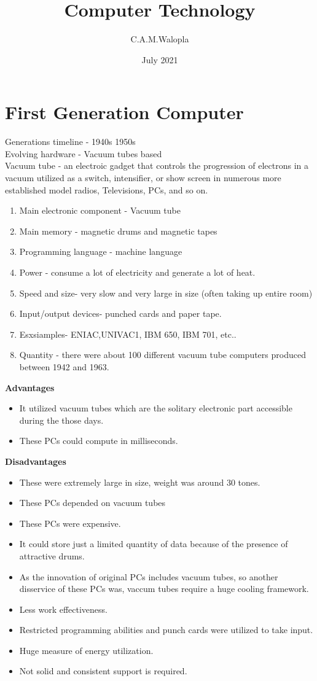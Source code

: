 \documentclass[a4paper,12pt]{article}
\begin{document}
\title{Computer Technology}
\author{C.A.M.Walopla}
\date{July 2021}
\section{First Generation Computer} 
Generations timeline - 1940s 1950s \\ 
Evolving hardware - Vacuum tubes based \\ 
Vacuum tube - an electroic gadget that controls the progression of electrons in a vacuum utilized as a switch, intensifier, or show screen in numerous more established model radios, Televisions, PCs, and so on.

\begin{enumerate}
\item Main electronic component - Vacuum tube
\item Main memory - magnetic drums and magnetic tapes
\item Programming language - machine language
\item Power - consume a lot of electricity and generate a lot of heat.
\item Speed and size- very slow and very large in size (often taking up entire room)
\item Input/output devices- punched cards and paper tape.
\item Esxsiamples- ENIAC,UNIVAC1, IBM 650, IBM 701, etc..
\item Quantity - there were about 100 different vacuum tube computers produced between 1942 and 1963.
\end{enumerate}

\textbf{Advantages} \\ 
\begin{itemize}
\item It utilized vacuum tubes which are the solitary electronic part accessible during the those days.
\item These PCs could compute in milliseconds.
\end{itemize}

\textbf{Disadvantages}
\begin{itemize}
\item These were extremely large in size, weight was around 30 tones.
\item These PCs depended on vacuum tubes
\item These PCs were expensive.
\item It could store just a limited quantity of data because of the presence of attractive drums.
\item As the innovation of original PCs includes vacuum tubes, so another disservice of these PCs was, vaccum tubes require a huge cooling framework.
\item Less work effectiveness.
\item Restricted programming abilities and punch cards were utilized to take input.
\item Huge measure of energy utilization.
\item Not solid and consistent support is required.
\end{itemize}
\end{document}
